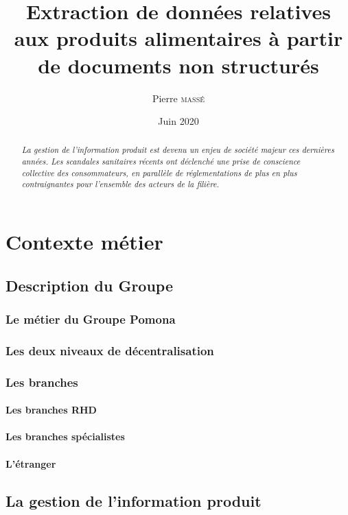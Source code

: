 \documentclass{report}
\title{Extraction de données relatives aux produits alimentaires à partir de documents non structurés}
\author{Pierre \textsc{massé}}
\date{Juin 2020}
\begin{document}
\maketitle

\large
\begin{abstract}
    {\em
    La gestion de l'information produit est devenu un enjeu de société majeur ces dernières années.
    Les scandales sanitaires récents ont déclenché une prise de conscience collective des consommateurs, en parallèle de réglementations de plus en plus contraignantes pour l'ensemble des acteurs de la filière\cite{incotext}\cite{incoexpl}.
    }
\end{abstract}
\normalsize

\tableofcontents

\part{Contexte métier}
    \chapter{Description du Groupe}
        \section{Le métier du Groupe Pomona}
        \section{Les deux niveaux de décentralisation}
        \section{Les branches}
            \subsection{Les branches RHD}
            \subsection{Les branches spécialistes}
            \subsection{L'étranger}
    \chapter{La gestion de l'information produit}
\end{document}
